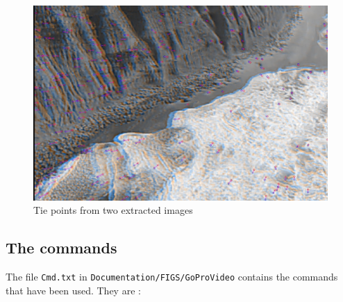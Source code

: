 \begin{figure}
\centering
\includegraphics[width=0.90\linewidth]{FIGS/GoProVideo/SIFT.jpg}
\caption{Tie points from two extracted images}
\label{fig:GoProSIFT}
\end{figure}


\subsection{The commands}\label{GoProVideo:Commands}

The file {\tt Cmd.txt} in {\tt Documentation/FIGS/GoProVideo} contains the commands that have been used. They are :

